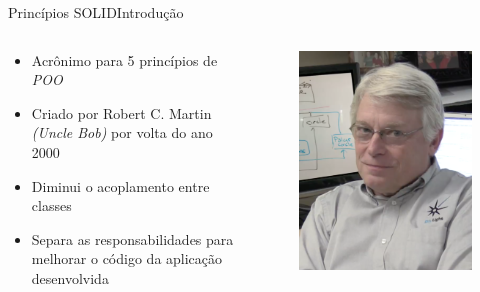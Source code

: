\documentclass[10pt]{beamer}
\begin{document}

\begin{frame}{Princípios SOLID}{Introdução}
\begin{columns}

\begin{column}{0.7\textwidth}
  \begin{itemize}
    \item Acrônimo para 5 princípios de \textit{POO}
    \item Criado por Robert C. Martin \textit{(Uncle Bob)} por volta do ano 2000
    \item<2-> Diminui o acoplamento entre classes
    \item<2-> Separa as responsabilidades para melhorar o código da aplicação desenvolvida
  \end{itemize}
\end{column}

\begin{column}{0.25\textwidth}
  \begin{figure}[uncleBob]
    \includegraphics[width=1.2\textwidth]{images/uncleBob.png}
  \end{figure}
\end{column}

\end{columns}
\end{frame}
\end{document}
